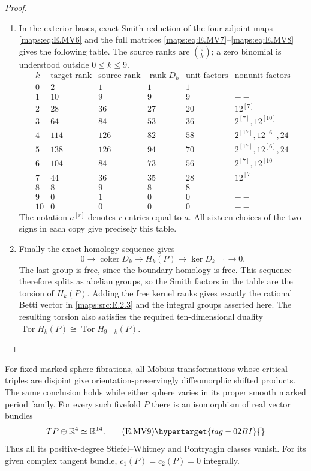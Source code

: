 \begin{proof}
\begin{enumerate}[label={$\langle1\rangle$\arabic*.},leftmargin=*]
\item In the exterior bases, exact Smith reduction of the four
adjoint maps \eqref{maps:eq:E.MV6} and the full matrices
\eqref{maps:eq:E.MV7}--\eqref{maps:eq:E.MV8} gives the following table. The source ranks are $\binom9k$; a zero binomial is
understood outside $0\leq k\leq9$.
\[
 \begin{array}{c|rrrr|l}
 k&\text{target rank}&\text{source rank}&\operatorname{rank}D_k&
       \text{unit factors}&\text{nonunit factors}\\\hline
 0&2&1&1&1&--\\
 1&10&9&9&9&--\\
 2&28&36&27&20&12^{[7]}\\
 3&64&84&53&36&2^{[7]},12^{[10]}\\
 4&114&126&82&58&2^{[17]},12^{[6]},24\\
 5&138&126&94&70&2^{[17]},12^{[6]},24\\
 6&104&84&73&56&2^{[7]},12^{[10]}\\
 7&44&36&35&28&12^{[7]}\\
 8&8&9&8&8&--\\
 9&0&1&0&0&--\\
 10&0&0&0&0&--
 \end{array}
\]
The notation $a^{[r]}$ denotes $r$ entries equal to $a$.
All sixteen choices of the two signs in each copy give precisely
this table.

\item Finally the exact homology sequence gives
\[
 0\longrightarrow\operatorname{coker}D_k
 \longrightarrow H_k(P)
 \longrightarrow\ker D_{k-1}\longrightarrow0.
\]
The last group is free, since the boundary homology is free.
This sequence therefore splits as abelian groups, so the Smith
factors in the table are the torsion of $H_k(P)$.
Adding the free kernel ranks gives exactly the rational Betti
vector in \ref{maps:src:E.2.3} and the integral groups asserted here.
The resulting torsion also satisfies the required ten-dimensional
duality $\operatorname{Tor}H_k(P)\cong
\operatorname{Tor}H_{9-k}(P)$.
\end{enumerate}
\end{proof}

\begin{proposition}\hypertarget{tag-02MR}{}\label{maps:src:E.2.7}


For fixed marked sphere fibrations, all M\"obius transformations
whose critical triples are disjoint give orientation-preservingly
diffeomorphic shifted products. The same conclusion holds while
either sphere varies in its proper smooth marked period family.
For every such fivefold $P$ there is an isomorphism of real vector
bundles
\[
 TP\oplus\mathbb R^4\simeq\mathbb R^{14}.
 \tag{E.MV9}\hypertarget{tag-02BI}{}\label{maps:eq:E.MV9}
\]
Thus all its positive-degree Stiefel--Whitney and Pontryagin
classes vanish. For its given complex tangent bundle,
$c_1(P)=c_2(P)=0$ integrally.
\end{proposition}


